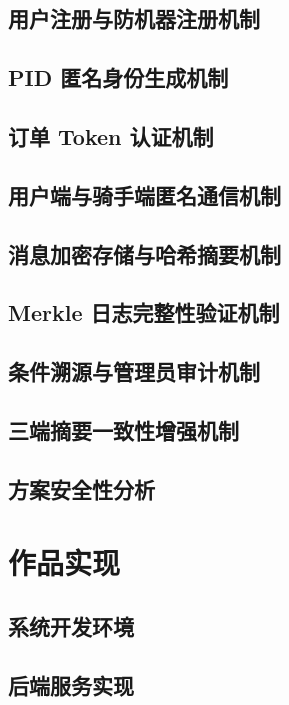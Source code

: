 \documentclass[UTF8,a4paper,zihao=-4,fontset=fandol]{ctexart}
\begin{document}
\subsection{用户注册与防机器注册机制}

\subsection{PID 匿名身份生成机制}

\subsection{订单 Token 认证机制}

\subsection{用户端与骑手端匿名通信机制}

\subsection{消息加密存储与哈希摘要机制}

\subsection{Merkle 日志完整性验证机制}

\subsection{条件溯源与管理员审计机制}

\subsection{三端摘要一致性增强机制}

\subsection{方案安全性分析}

\newpage
\section{作品实现}
\subsection{系统开发环境}

\subsection{后端服务实现}
\end{document}
